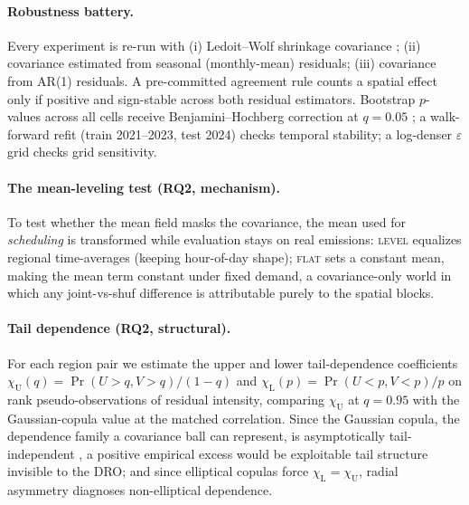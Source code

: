 \documentclass[12pt]{article}
\newcommand{\chiU}{\chi_{\mathrm{U}}}
\newcommand{\chiL}{\chi_{\mathrm{L}}}
\begin{document}
\paragraph{Robustness battery.} Every experiment is re-run with (i) Ledoit--Wolf
shrinkage covariance \citep{ledoit2004}; (ii) covariance estimated from seasonal
(monthly-mean) residuals; (iii) covariance from AR(1) residuals. A pre-committed
agreement rule counts a spatial effect only if positive and sign-stable across
both residual estimators. Bootstrap $p$-values across all cells receive
Benjamini--Hochberg correction at $q=0.05$ \citep{benjamini1995}; a walk-forward
refit (train 2021--2023, test 2024) checks temporal stability; a log-denser
$\varepsilon$ grid checks grid sensitivity.

\paragraph{The mean-leveling test (RQ2, mechanism).} To test whether the mean field masks the
covariance, the mean used for \emph{scheduling} is transformed while evaluation
stays on real emissions: \textsc{level} equalizes regional time-averages (keeping
hour-of-day shape); \textsc{flat} sets a constant mean, making the mean term
constant under fixed demand, a covariance-only world in which any joint-vs-shuf
difference is attributable purely to the spatial blocks.

\paragraph{Tail dependence (RQ2, structural).} For each region pair we estimate
the upper and lower tail-dependence coefficients
$\chiU(q)=\Pr(U>q,V>q)/(1-q)$ and $\chiL(p)=\Pr(U<p,V<p)/p$ on rank
pseudo-observations of residual intensity, comparing $\chiU$ at $q=0.95$ with the
Gaussian-copula value at the matched correlation. Since the Gaussian copula, the dependence family a covariance ball can represent, is asymptotically
tail-independent \citep{embrechts2002}, a positive empirical excess would be
exploitable tail structure invisible to the DRO; and since elliptical copulas force
$\chiL=\chiU$, radial asymmetry diagnoses non-elliptical dependence.
\end{document}
